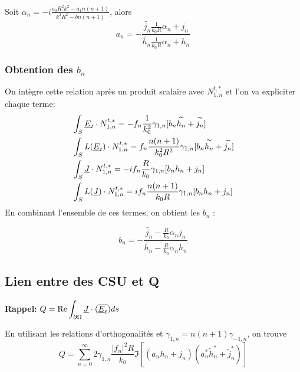 Soit $ \alpha_n =-i\frac{a_0R^2k^2 - a_1 n (n+1)}{k^2R^2 - bn(n+1)}$, alors
\begin{equation}
  \label{eq:an_mie} a_n = -\frac{\tilde{j_n}\frac{1}{k_0R}\alpha_n +j_n}{\tilde{h_n}\frac{1}{k_0R}\alpha_n + h_n}
\end{equation}

\subsubsection{Obtention des $b_n$}
On intègre cette relation après un produit scalaire avec $N_{1,n}^{t,*}$ et l'on va expliciter chaque terme:
\begin{align*}
  &\int_S \E_t\cdot N_{1,n}^{t,*} = - f_n \frac{1}{k_0^2} \gamma_{1,n}[b_n\tilde{h_n} + \tilde{j_n} ]\\
  &\int_S L(\E_t)\cdot N_{1,n}^{t,*} =  f_n \frac{n(n+1)}{k_0^2R^2}\gamma_{1,n}[b_n\tilde{h_n} + \tilde{j_n}]\\
  &\int_S \J \cdot N_{1,n}^{t,*} = - i f_n \frac{R}{k_0}\gamma_{1,n}[b_n {h_n} + {j_n}]\\
  &\int_S L(\J) \cdot N_{1,n}^{t,*} =  i f_n \frac{n(n+1)}{k_0 R} \gamma_{1,n}[b_n {h_n} + {j_n}]\\
\end{align*}
En combinant l'ensemble de ces termes, on obtient les $b_n$ :

\begin{equation}
  \label{eq:bn_mie} b_n = -\frac{\tilde{j_n}- \frac{R}{k_0}\alpha_n j_n}{\tilde{h_n}-\frac{R}{k_0}\alpha_nh_n}
\end{equation}
\subsection{Lien entre des CSU et Q}
\textbf{Rappel:} $\ds Q=\Re{\int_{\d\Omega}\J\cdot(\conj{\E_t})ds}$

En utilisant les relations d'orthogonalités et $\gamma_{1,n} = n(n+1)\gamma_{-1,n}$, on trouve
\[
  Q = \sum_ {n=0}^{\infty}2\gamma_{1,n}\frac{|f_n|^2R}{k_0}\Im{
  \left[
    (a_n h_n + j_n)(a_n^* \tilde h_n^* + \tilde j_n^*) 
  \right]}
\]

\iffalse
\subsection{Notes, remarques}
Étant donnée la CI dans \cite{marceaux_high-order_2000} en $\n \pvect \E = Z \H_t$ et avec le fait qu'il intègre sur l'intérieur donc avec $M^i, N^i$, mes expressions des $a_n,b_n$ sont différentes, mais dans le même ordre d'idée : 
\[
a_n \mapsto b_n, \alpha_n \mapsto - i \eta_0/\eta k \alpha_n^{-1}
\]
\[
b_n \mapsto a_n, \beta_n \mapsto - i \eta_0/\eta k \beta_n^{-1}
\]
\fi


\begin{tikzpicture}

\end{tikzpicture}